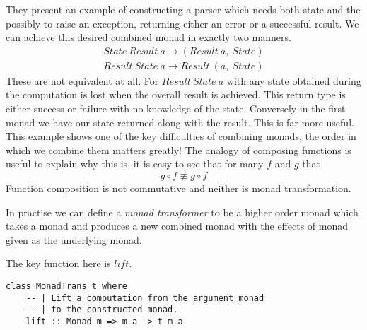 They present an example of constructing a parser which needs both state
and the possibly to raise an exception,
returning either an error or a successful result.
We can achieve this desired combined monad in exactly two manners.
\begin{align}
    State\ Result\ a \rightarrow (Result\ a,\ State)\\
    Result\ State\ a \rightarrow Result\ (a,\ State)
\end{align}
These are not equivalent at all.
For $Result\ State\ a$ with any state obtained during the computation
is lost when the overall result is achieved.
This return type is either success or failure with no knowledge of the state.
Conversely in the first monad we have our state returned along with the result.
This is far more useful.
This example shows one of the key difficulties of combining monads,
the order in which we combine them matters greatly!
The analogy of composing functions is useful to explain why this is,
it is easy to see that for many $f$ and $g$ that
\begin{equation}
    g \circ f \not\equiv g \circ f
\end{equation}
Function composition is not commutative and neither
is monad transformation.

In practise we can define a \textit{monad transformer}
to be a higher order monad which takes a monad
and produces a new combined monad with the effects of
monad given as the underlying monad.

The key function here is $lift$.
\begin{verbatim}
class MonadTrans t where
    -- | Lift a computation from the argument monad
    -- | to the constructed monad.
    lift :: Monad m => m a -> t m a

\end{verbatim}

